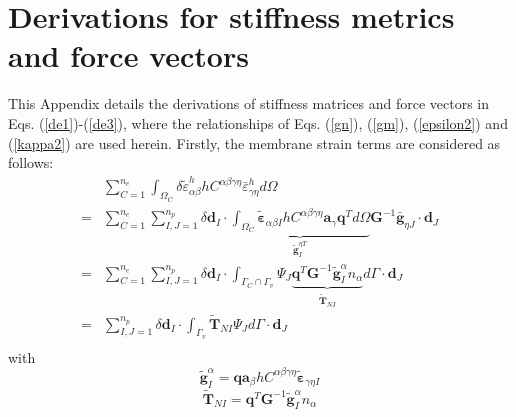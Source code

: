 \section{Derivations for stiffness metrics and force vectors}\label{derivations}
This Appendix details the derivations of stiffness matrices and force vectors in Eqs. (\ref{de1})-(\ref{de3}), where the relationships of Eqs. (\ref{gn}), (\ref{gm}), (\ref{epsilon2}) and (\ref{kappa2}) are used herein. Firstly, the membrane strain terms are considered as follows:
\begin{equation}
\begin{split}
&\sum_{C=1}^{n_e}\int_{\Omega_C} \delta \tilde \varepsilon_{\alpha\beta}^h hC^{\alpha\beta\gamma\eta}\bar \varepsilon^h_{\gamma\eta} d\Omega \\
        =&\sum_{C=1}^{n_e}\sum_{I,J=1}^{n_p}\delta \boldsymbol d_I \cdot \underbrace{\int_{\Omega_C} \tilde{\boldsymbol \varepsilon}_{\alpha\beta I} hC^{\alpha\beta\gamma\eta} \boldsymbol a_\gamma \boldsymbol q^T d\Omega}_{\tilde{\boldsymbol g}^{\eta T}_I} \boldsymbol G^{-1} \bar{\boldsymbol g}_{\eta J} \cdot \boldsymbol d_J \\
        =&\sum_{C=1}^{n_e}\sum_{I,J=1}^{n_p}\delta \boldsymbol d_I \cdot \int_{\Gamma_C\cap\Gamma_v} \Psi_J \underbrace{\boldsymbol q^T \boldsymbol G^{-1}\tilde{\boldsymbol g}^\alpha_I
        n_\alpha}_{\tilde{\boldsymbol T}_{NI}} d\Gamma
       \cdot \boldsymbol d_J \\
        =&\sum_{I,J=1}^{n_p}\delta \boldsymbol d_I \cdot \int_{\Gamma_v} \tilde{\boldsymbol T}_{NI}\Psi_J d\Gamma
       \cdot \boldsymbol d_J \\
\end{split}
\end{equation}
with
\begin{equation}
        \tilde{\boldsymbol g}^\alpha_I = \boldsymbol q \boldsymbol a_\beta hC^{\alpha\beta\gamma\eta} \tilde{\boldsymbol \varepsilon}_{\gamma\eta I}
\end{equation}
\begin{equation}
        \tilde{\boldsymbol T}_{NI} = \boldsymbol q^T \boldsymbol G^{-1} \tilde{\boldsymbol g}_I^\alpha n_\alpha
\end{equation}

